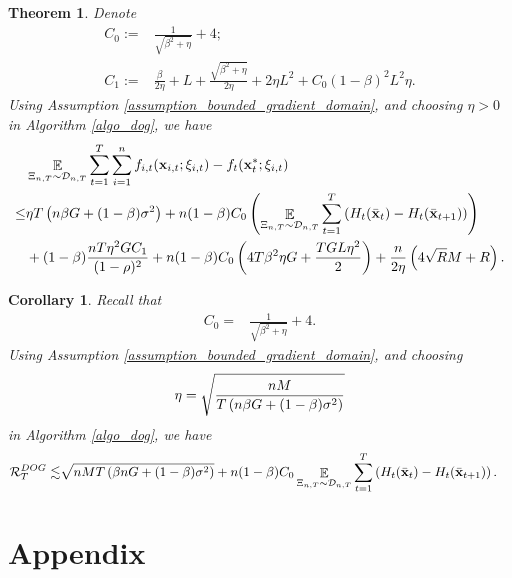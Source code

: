 \documentclass{article}
\newtheorem{Theorem}{\bf{Theorem}}
\newtheorem{Corollary}{\bf{Corollary}}
\begin{document}
\begin{Theorem}
\label{theorem_regret_upper_bound}
Denote 
\begin{align}
\nonumber
C_0 := & \frac{1}{\sqrt{\beta^2 + \eta}} + 4; \\ \nonumber
C_1 := & \frac{\beta}{2\eta } +L + \frac{\sqrt{\beta^2 + \eta}}{2\eta} + 2\eta L^2  + C_0 (1-\beta)^2L^2 \eta.
\end{align} Using Assumption \ref{assumption_bounded_gradient_domain}, and choosing $\eta>0$ in Algorithm \ref{algo_dog}, we have
\begin{align}
\nonumber
& \mathop{\mathbb{E}}_{ \Xi_{n,T} \sim \mathcal{D}_{n,T} } \sum_{t=1}^T\sum_{i=1}^n f_{i,t}({\bf x}_{i,t};\xi_{i,t}) - f_t({\bf x}_t^\ast;\xi_{i,t}) \\ \nonumber
\le & \eta T \left(  n\beta G + (1-\beta)\sigma^2 \right) + n(1-\beta)C_0 \left(  \mathop{\mathbb{E}}_{ \Xi_{n,T} \sim \mathcal{D}_{n,T} } \sum_{t=1}^T  \left( H_t(\bar{{\bf x}}_t) - H_t(\bar{{\bf x}}_{t+1}) \right)   \right) \\ \nonumber
& + (1-\beta)  \frac{nT\eta^2 G C_1}{(1-\rho)^2}  + n(1-\beta)C_0 \left(  4T\beta^2 \eta G + \frac{TGL\eta^2}{2}  \right)  + \frac{n}{2\eta}\left(  4\sqrt{R}M + R   \right).
\end{align}

\end{Theorem}


\begin{Corollary}
Recall that 
\begin{align}
\nonumber
C_0 = & \frac{1}{\sqrt{\beta^2 + \eta}} + 4.
\end{align}
Using Assumption \ref{assumption_bounded_gradient_domain}, and choosing 
\begin{align}
\nonumber
\eta = \sqrt{\frac{nM}{ T\left( n\beta G + (1-\beta)\sigma^2 \right) }}
\end{align} in Algorithm \ref{algo_dog}, we have
\begin{align}
\nonumber
{\mathcal{R}}_T^{DOG} \lesssim & \sqrt{nMT\left( \beta nG + (1-\beta)\sigma^2 \right)} + n(1-\beta)C_0  \mathop{\mathbb{E}}_{ \Xi_{n,T} \sim \mathcal{D}_{n,T} } \sum_{t=1}^T  \left( H_t(\bar{{\bf x}}_t) - H_t(\bar{{\bf x}}_{t+1}) \right).
\end{align}






\end{Corollary}








\section*{Appendix}
\end{document}
